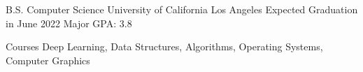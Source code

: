 \documentclass[12pt, letterpaper]{awesome-cv}
\begin{document}
\makecvheader


\begin{cventries}
  \cventry
    {B.S. Computer Science} %
    {University of California Los Angeles} %
    {Expected Graduation in June 2022} %
    {Major GPA: 3.8} %
    {
      \vspace{-0.11in}
      \begin{cvskills}
        \cvskill
          {Courses} %
          {Deep Learning, Data Structures, Algorithms, Operating Systems, Computer Graphics} %
      \end{cvskills}
    }
  \vspace{-0.2in}
\end{cventries}
\end{document}

